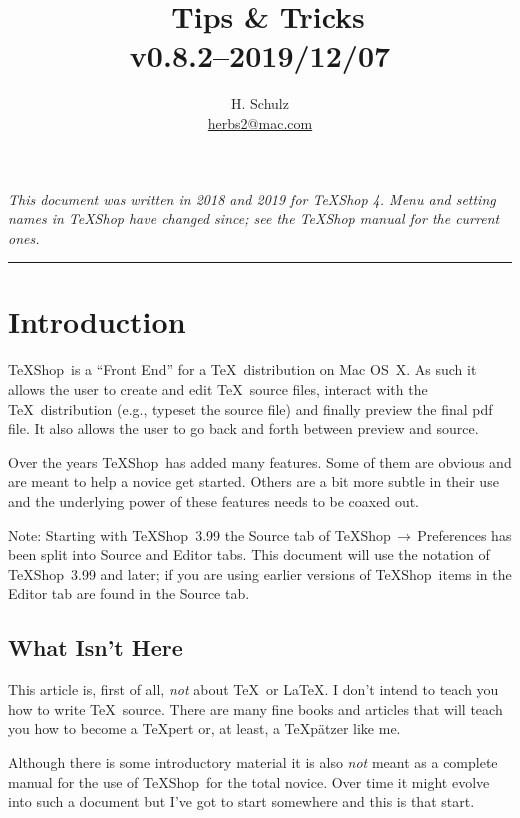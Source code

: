 \documentclass[letterpaper,11pt]{article}
\title{\TS\ Tips \& Tricks\\\small v0.8.2--2019/12/07}
\author{H. Schulz
\\\small\href{mailto:herbs2@mac.com}{herbs2@mac.com}}
\date{}
\newcommand{\TS}{\textsf{\TeX Shop}}
\newcommand{\acr}[1]{\textsf{#1}}
\newcommand{\cmd}[1]{\textsf{#1}}
\newcommand{\mnu}[1]{\textsf{#1}}
\newcommand{\To}{\,\(\to\)\,}
\begin{document}
\maketitle
\noindent\textit{This document was written in 2018 and 2019 for TeXShop 4. Menu and setting names in TeXShop have changed since; see the TeXShop manual for the current ones.}

\tableofcontents

\begin{center}
\rule{0.5\textwidth}{1pt}
\end{center}

\section{Introduction}

\TS\ is a ``Front End'' for a \TeX\ distribution on \cmd{Mac OS~X}. As such it allows the user to create and edit \TeX\ source files, interact with the \TeX\ distribution (e.g., typeset the source file) and finally preview the final \acr{pdf} file. It also allows the user to go back and forth between preview and source.

Over the years \TS\ has added many features. Some of them are obvious and are meant to help a novice get started. Others are a bit more subtle in their use and the underlying power of these features needs to be coaxed out.

Note: Starting with \TS\ 3.99 the \mnu{Source} tab of \mnu{TeXShop}\To\mnu{Preferences} has been split into  \mnu{Source} and \mnu{Editor} tabs. This document will use the notation of \TS\ 3.99 and later; if you are using earlier versions of \TS\ items in the \mnu{Editor} tab are found in the \mnu{Source} tab.

\subsection{What Isn't Here}

This article is, first of all, \emph{not} about \TeX\ or \LaTeX. I don't intend to teach you how to write \TeX\ source. There are many fine books and articles that will teach you how to become a \TeX pert or, at least, a \TeX pätzer like me.

Although there is some introductory material it is also \emph{not} meant as a complete manual for the use of \TS\ for the total novice. Over time it might evolve into such a document but I've got to start somewhere and this is that start.
\end{document}
